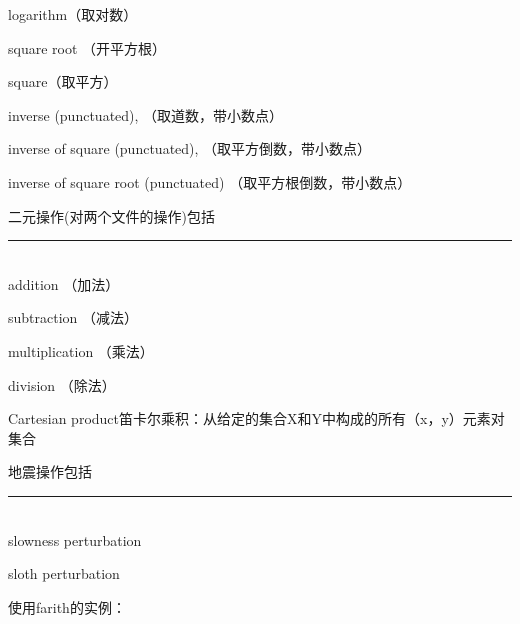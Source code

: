 \begin{enumerate}
	logarithm（取对数）\par	
	square root （开平方根）\par
	square（取平方）\par
	inverse (punctuated), （取道数，带小数点）\par
	inverse of square (punctuated), （取平方倒数，带小数点）\par
	inverse of square root (punctuated) （取平方根倒数，带小数点）\par
    \vspace{0.6cm}
	二元操作(对两个文件的操作)包括\par
	\rule{0.9\textwidth}{0.1em}\\
	addition （加法）\par
	subtraction  （减法）\par
	multiplication （乘法）\par
	division  （除法）\par
	Cartesian product笛卡尔乘积：从给定的集合X和Y中构成的所有（x，y）元素对集合\par
	\vspace{0.6cm}
	地震操作包括\par
	\rule{0.9\textwidth}{0.1em}\\
	slowness perturbation\par
	sloth perturbation\par
	\vspace{0.4cm}
	使用farith的实例：\par
	\par
\end{enumerate}                  
                
   
                 
   
